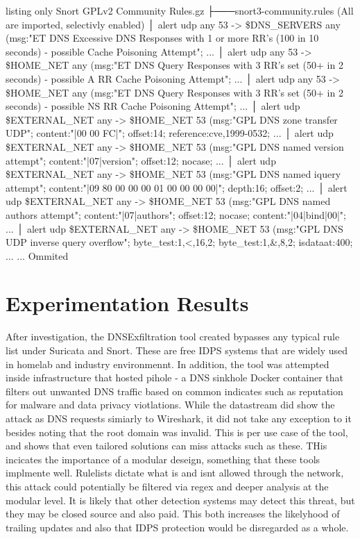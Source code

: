 \begin{tcblisting}{listing only}
Snort GPLv2 Community Rules.gz
├───snort3-community.rules (All are imported, selectivly enabled)
    │ alert udp any 53 -> \$DNS_SERVERS any (msg:"ET DNS Excessive DNS Responses with 1 or more RR's (100\+ in 10 seconds) - possible Cache Poisoning Attempt"; ...
    │ alert udp any 53 -> \$HOME_NET any (msg:"ET DNS Query Responses with 3 RR's set (50+ in 2 seconds) - possible A RR Cache Poisoning Attempt"; ...
    │ alert udp any 53 -> \$HOME_NET any (msg:"ET DNS Query Responses with 3 RR's set (50+ in 2 seconds) - possible NS RR Cache Poisoning Attempt"; ...
    │ alert udp \$EXTERNAL_NET any -> \$HOME_NET 53 (msg:"GPL DNS zone transfer UDP"; content:"|00 00 FC|"; offset:14; reference:cve,1999-0532; ...
    │ alert udp \$EXTERNAL_NET any -> \$HOME_NET 53 (msg:"GPL DNS named version attempt"; content:"|07|version"; offset:12; nocase; ...
    │ alert udp \$EXTERNAL_NET any -> \$HOME_NET 53 (msg:"GPL DNS named iquery attempt"; content:"|09 80 00 00 00 01 00 00 00 00|"; depth:16; offset:2; ...
    │ alert udp \$EXTERNAL_NET any -> \$HOME_NET 53 (msg:"GPL DNS named authors attempt"; content:"|07|authors"; offset:12; nocase; content:"|04|bind|00|"; ...
    │ alert udp \$EXTERNAL_NET any -> \$HOME_NET 53 (msg:"GPL DNS UDP inverse query overflow"; byte_test:1,<,16,2; byte_test:1,&,8,2; isdataat:400; ...
    ... Ommited

\end{tcblisting}


\section{Experimentation Results}
After investigation, the DNSExfiltration tool created bypasses any typical rule list under Suricata and Snort. These are free IDPS systems that are widely used in homelab and industry environmennt. In addition, the tool was attempted inside infrastructure that hosted pihole - a DNS sinkhole Docker container that filters out unwanted DNS traffic based on common indicates such as reputation for malware and data privacy viotlations.
While the datastream did show the attack as DNS requests simiarly to Wireshark, it did not take any exception to it besides noting that the root domain was invalid. This is per use case of the tool, and shows that even tailored solutions can miss attacks such as these. THis incicates the importance of a modular deseign, something that these tools implmente well. Rulelists dictate what is and isnt allowed through the network, this attack could potentially be filtered 
via regex and deeper analysis at the modular level. It is likely that other detection systems may detect this threat, but they may be closed source and also paid. This both increases the likelyhood of trailing updates and also that IDPS protection would be disregarded as a whole.

